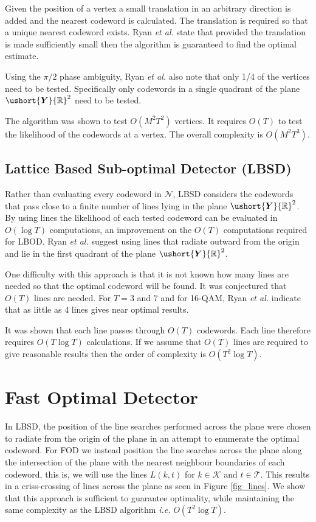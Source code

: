 \documentclass[conference]{IEEEtran}
\newcommand{\reals}{{\mathbb R}}
\newcommand{\uY}{\ushort{\bm{Y}}}
\begin{document}
Given the position of a vertex a small translation in an arbitrary direction is added and the nearest codeword is calculated.  The translation is required so that a unique nearest codeword exists.  Ryan \emph{et al.} state that provided the translation is made sufficiently small then the algorithm is guaranteed to find the optimal estimate.

Using the $\pi/2$ phase ambiguity, Ryan \emph{et al.} also note that only 1/4 of the vertices need to be tested.  Specifically only codewords in a single quadrant of the plane $\uY\reals^2$ need to be tested.

The algorithm was shown to test $O(M^2T^2)$ vertices.  It requires $O(T)$ to test the likelihood of the codewords at a vertex.   The overall complexity is $O(M^2T^3)$.


\subsection{Lattice Based Sub-optimal Detector (LBSD)} \label{T2logTsuboptimal}

Rather than evaluating every codeword in ${\mathcal N}$, LBSD considers the codewords that pass close to a finite number of lines lying in the plane $\uY\reals^2$.  By using lines the likelihood of each tested codeword can be evaluated in $O(\log{T})$ computations, an improvement on the $O(T)$ computations required for LBOD.  Ryan \emph{et al.} suggest using lines that radiate outward from the origin and lie in the first quadrant of the plane $\uY\reals^2$.

One difficulty with this approach is that it is not known how many lines are needed so that the optimal codeword will be found.  It was conjectured that $O(T)$ lines are needed.  For $T=3$ and $7$ and for 16-QAM, Ryan \emph{et al.} indicate that as little as $4$ lines gives near optimal results.

It was shown that each line passes through $O(T)$ codewords.  Each line therefore requires $O(T\log{T})$ calculations.  If we assume that $O(T)$ lines are required to give reasonable results then the order of complexity is $O(T^2\log{T})$.
 
 
\section{Fast Optimal Detector} \label{new_algorithm}

In LBSD, the position of the line searches performed across the plane were chosen to radiate from the origin of the plane in an attempt to enumerate the optimal codeword. For FOD we instead position the line searches across the plane along the intersection of the plane with the nearest neighbour boundaries of each codeword, this is, we will use the lines $L(k,t)$ for $k \in {\mathcal K}$ and $t \in {\mathcal T}$.  This results in a criss-crossing of lines across the plane as seen in Figure \ref{fig_lines}. We show that this approach is sufficient to guarantee optimality, while maintaining the same complexity as the LBSD algorithm \emph{i.e.} $O(T^2\log{T})$.
\end{document}
